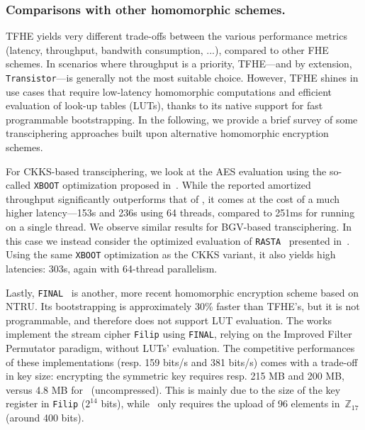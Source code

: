 \subsubsection{Comparisons with other homomorphic schemes.} 
TFHE yields very different trade-offs between the various performance metrics (latency, throughput, bandwith consumption, ...), compared to other FHE schemes. In scenarios where throughput is a priority, TFHE—and by extension, \texttt{Transistor}—is generally not the most suitable choice. However, TFHE shines in use cases that require low-latency homomorphic computations and efficient evaluation of look-up tables (LUTs), thanks to its native support for fast programmable bootstrapping.
In the following, we provide a brief survey of some transciphering approaches built upon alternative homomorphic encryption schemes.

For CKKS-based transciphering, we look at the AES evaluation using the so-called \texttt{XBOOT} optimization proposed in~\cite{cryptoeprint:2025/074}. While the reported amortized throughput significantly outperforms that of \coolName, it comes at the cost of a much higher latency—153s and 236s using 64 threads, compared to 251ms for \coolName running on a single thread. We observe similar results for  BGV-based transciphering. In this case we instead consider the optimized evaluation of \texttt{RASTA}~\cite{DBLP:conf/crypto/DobraunigE0LLLM18} presented in~\cite{cryptoeprint:2025/074}. Using the same \texttt{XBOOT} optimization as the CKKS variant, it also yields high latencies: 303s, again with 64-thread parallelism. 

Lastly, \texttt{FINAL}~\cite{AC:BIPPS22} is another, more recent homomorphic encryption scheme based on NTRU. Its bootstrapping is approximately 30\% faster than TFHE’s, but it is not programmable, and therefore does not support LUT evaluation. The works~\cite{CiC:MeaParPer24,CCS:CDPP22} implement the stream cipher \texttt{Filip} using \texttt{FINAL}, relying on the Improved Filter Permutator paradigm, without LUTs' evaluation. The competitive performances of these implementations (resp. 159 bits/s and 381 bits/s) comes with a trade-off in key size: encrypting the symmetric key requires resp. 215 MB and 200 MB, versus 4.8 MB for \coolName~(uncompressed). This is mainly due to the size of the key register in \texttt{Filip} ($2^{14}$ bits), while \coolName~only requires the upload of 96 elements in~$\mathbb{Z}_{17}$ (around 400 bits).

